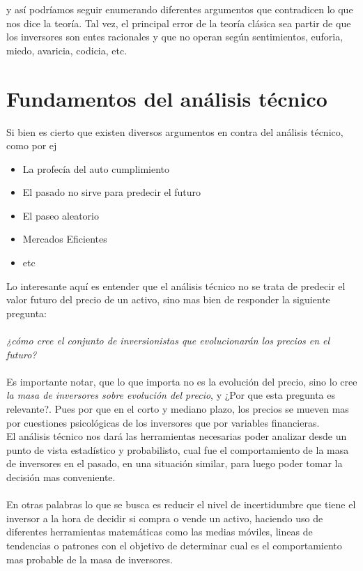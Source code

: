 y así podríamos seguir enumerando diferentes argumentos que contradicen lo que nos dice la teoría. Tal vez, el principal error de la teoría clásica sea partir de que los inversores son entes racionales y que no operan según sentimientos, euforia, miedo, avaricia, codicia, etc.

\section{Fundamentos del análisis técnico}

Si bien es cierto que existen diversos argumentos en contra del análisis técnico, como por ej

\begin{itemize}
	\item La profecía del auto cumplimiento
	\item El pasado no sirve para predecir el futuro
	\item El paseo aleatorio
	\item Mercados Eficientes
	\item etc
\end{itemize}

Lo interesante aquí es entender que el análisis técnico no se trata de predecir el valor futuro del precio de un activo, sino mas bien de responder la siguiente pregunta:\\\\

\emph{¿cómo cree el conjunto de inversionistas que evolucionarán los precios en el futuro? }
\\\\

Es importante notar, que lo que importa no es la evolución del precio, sino lo cree \emph{la masa de inversores sobre evolución del precio}, y ¿Por que esta pregunta es relevante?. Pues por que en el corto y mediano plazo, los precios se mueven mas por cuestiones psicológicas de los inversores que por variables financieras.\\

El análisis técnico nos dará las herramientas necesarias poder analizar desde un punto de vista estadístico y probabilisto, cual fue el comportamiento de la masa de inversores en el pasado, en una situación similar, para luego poder tomar la decisión mas conveniente.
\\\\
En otras palabras lo que se busca es reducir el nivel de incertidumbre que tiene el inversor a la hora de decidir si compra o vende un activo, haciendo uso de diferentes herramientas matemáticas como las medias móviles, lineas de tendencias o patrones con el objetivo de determinar cual es el comportamiento mas probable de la masa de inversores.


